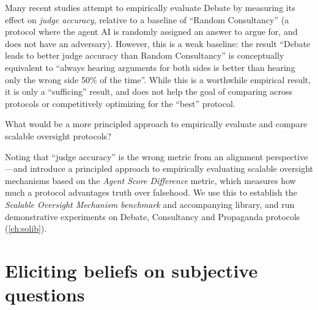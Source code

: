 \begin{researchquestion}\label{rq:benchmark}
Many recent studies \citep{radhakrishnanAnthropicFall20232023,michael2023debateSuperviseUnreliableExperts,khanDebatingMorePersuasive2024,kentonScalableOversightWeak2024,arnesenTrainingLanguageModels2024} attempt to empirically evaluate Debate by measuring its effect on \emph{judge accuracy}, relative to a baseline of ``Random Consultancy'' (a protocol where the agent AI is randomly assigned an answer to argue for, and does not have an adversary). However, this is a weak baseline: the result ``Debate leads to better judge accuracy than Random Consultancy'' is conceptually equivalent to ``always hearing arguments for both sides is better than hearing only the wrong side 50\% of the time''. While this is a worthwhile empirical result, it is only a ``sufficing'' result, and does not help the goal of comparing across protocols or competitively optimizing for the ``best'' protocol.

What would be a more principled approach to empirically evaluate and compare scalable oversight protocols?
\end{researchquestion}

\begin{contribution}
Noting that ``judge accuracy'' is the wrong metric from an alignment perspective---and introduce a principled approach to empirically evaluating scalable oversight mechanisms based on the \emph{Agent Score Difference} metric, which measures how much a protocol advantages truth over falsehood. We use this to establish the \emph{Scalable Oversight Mechanism benchmark} and accompanying library, and run demonstrative experiments on Debate, Consultancy and Propaganda protocols (\cref{ch:solib}).
\end{contribution}

\section{Eliciting beliefs on subjective questions}\label{intro:sec:subjective}

